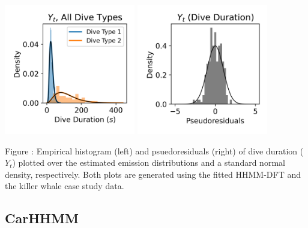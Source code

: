 \documentclass{article}
\begin{document}
        \begin{center}
        \includegraphics[width=2.25in]{../Plots/2019/20190902-182840-CATs_OB_1_0_267_HHMM_empirical_hist_dive_duration.png}
        \includegraphics[width=2.25in]{../Plots/2019/20190902-182840-CATs_OB_1_0_267_HHMM_pseudresids_Dive_Duration.png}
        \end{center}
        
        \noindent Figure : Empirical histogram (left) and psuedoresiduals (right) of dive duration ($Y_{t}$) plotted over the estimated emission distributions and a standard normal density, respectively. Both plots are generated using the fitted HHMM-DFT and the killer whale case study data.
        \addtocounter{fignum}{1}
        
        \subsection{CarHHMM}
        
\end{document}
